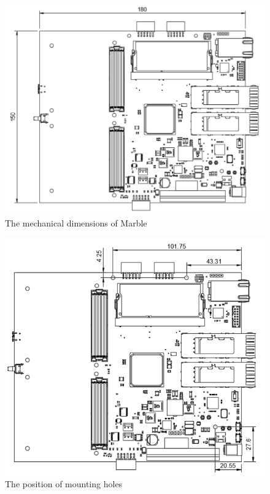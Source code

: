 \documentclass[12pt,oneside,a4]{article}
\begin{document}
\begin{figure}[H]
\begin{center}
\includegraphics[width=1\linewidth]{mechanical.png}
 \caption{The mechanical dimensions of Marble}\label{mechanical}
\end{center}
\end{figure}

\begin{figure}[H]
\begin{center}
\includegraphics[width=1\linewidth]{holes.png}
 \caption{The position of mounting holes}\label{holes}
\end{center}
\end{figure}
\end{document}
